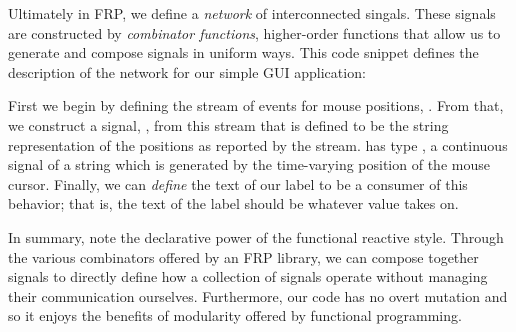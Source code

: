 Ultimately in FRP, we define a \emph{network} of interconnected singals.
These signals are constructed by \emph{combinator functions}, higher-order functions that allow us to generate and compose signals in uniform ways.
This code snippet defines the description of the network for our simple GUI application:
\begin{center}
\begin{minipage}{0.725\textwidth}
\end{minipage}
\end{center}
First we begin by defining the stream of events for mouse positions, .
From that, we construct a signal, , from this stream that is defined to be the string representation of the positions as reported by the stream.
 has type , a continuous signal of a string which is generated by the time-varying position of the mouse cursor.
Finally, we can \emph{define} the text of our label to be a consumer of this behavior; that is, the text of the label should be whatever  value  takes on.

In summary, note the declarative power of the functional reactive style.
Through the various combinators offered by an FRP library, we can compose together signals to directly define how a collection of signals operate without managing their communication ourselves.
Furthermore, our code has no overt mutation and so it enjoys the benefits of modularity offered by functional programming.
